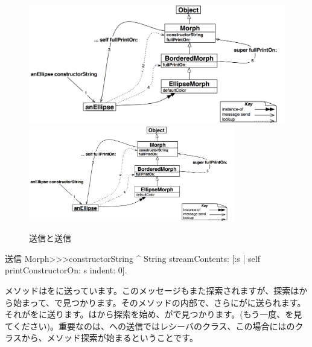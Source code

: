 \documentclass[a4paper,10pt,twoside]{book}
\begin{document}
\begin{figure}[htb]
\begin{center}
\ifluluelse
	{\includegraphics[width=\textwidth]{constructorStringLookup}}
	{\includegraphics[width=0.8\textwidth]{constructorStringLookup}}
\caption{\self 送信と\super 送信}
\end{center}
\end{figure}

\begin{method}[constructorString]{\self 送信}
Morph>>>constructorString
	^ String streamContents: [:s | self printConstructorOn: s indent: 0].
\end{method}
メソッドはを\self に送っています。このメッセージもまた探索されますが、探索はから始まって、で見つかります。そのメソッドの内部で、さらにが\self に送られます。それがを\self に送ります。はから探索を始め、がで見つかります。(もう一度、を見てください)。重要なのは、\self への送信ではレシーバのクラス、この場合にはのクラスから、メソッド探索が始まるということです。

\end{document}
